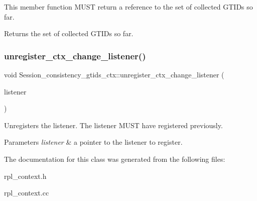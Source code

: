 This member function M\+U\+ST return a reference to the set of collected G\+T\+I\+Ds so far.

\begin{DoxyReturn}{Returns}
the set of collected G\+T\+I\+Ds so far. 
\end{DoxyReturn}
\mbox{\label{classSession__consistency__gtids__ctx_a66c0b87081a934634af4a4055833cc51}} 
\subsubsection{\texorpdfstring{unregister\+\_\+ctx\+\_\+change\+\_\+listener()}{unregister\_ctx\_change\_listener()}}
{\footnotesize\ttfamily void Session\+\_\+consistency\+\_\+gtids\+\_\+ctx\+::unregister\+\_\+ctx\+\_\+change\+\_\+listener (\begin{DoxyParamCaption}\item[{\mbox{\hyperlink{classSession__consistency__gtids__ctx_1_1Ctx__change__listener}{Session\+\_\+consistency\+\_\+gtids\+\_\+ctx\+::\+Ctx\+\_\+change\+\_\+listener}} $\ast$}]{listener }\end{DoxyParamCaption})}

Unregisters the listener. The listener M\+U\+ST have registered previously.


\begin{DoxyParams}{Parameters}
{\em listener} & a pointer to the listener to register. \\
\hline
\end{DoxyParams}


The documentation for this class was generated from the following files\+:\begin{DoxyCompactItemize}
\item 
rpl\+\_\+context.\+h\item 
rpl\+\_\+context.\+cc\end{DoxyCompactItemize}
